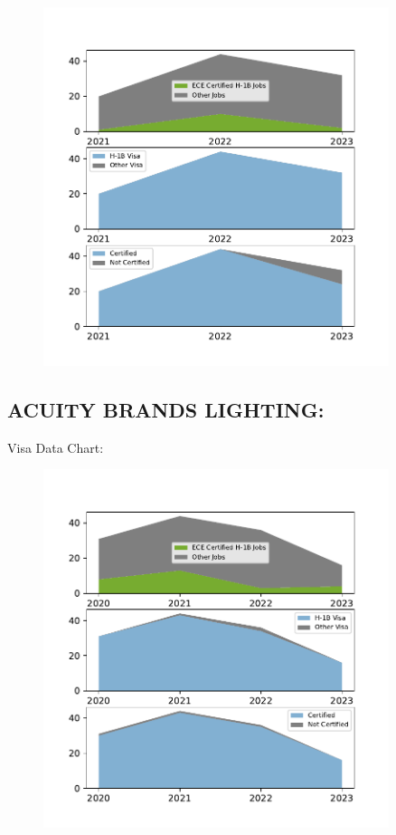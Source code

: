 \documentclass{article}%
\begin{document}
\begin{figure}[htbp]%
\centering%
\includegraphics[width=0.9\textwidth]{./temp_img/ACTALENTSERVICES_detailed.pdf}%
\end{figure}

%
\newpage%
\subsection{ACUITY BRANDS LIGHTING:}%
\label{subsec:ACUITYBRANDSLIGHTING}%
Visa Data Chart:%


\begin{figure}[htbp]%
\centering%
\includegraphics[width=0.9\textwidth]{./temp_img/ACUITYBRANDSLIGHTING_detailed.pdf}%
\end{figure}
\end{document}
